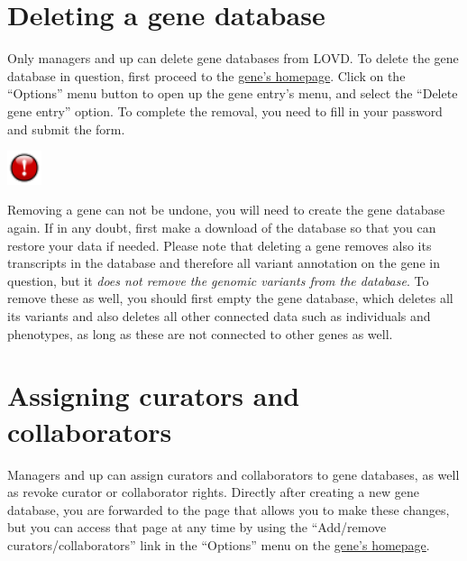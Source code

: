 \documentclass[a4paper,oneside,openany,12pt]{memoir}
\newlength{\infoboxlength}
\newlength{\infoboxinnerlength}
\newenvironment{warntable}
  {\begin{lrbox}{\infobox}%
    \begin{minipage}[t]{1.5cm}
      \centering
      \vspace{0pt}
      \includegraphics[width=1cm,height=1cm]{lovd_warning.png}
    \end{minipage}
   \begin{minipage}[t]{\infoboxlength}\vspace{5pt}\begin{minipage}{\infoboxinnerlength}}
  {\vspace{6pt}\end{minipage}\end{minipage}\end{lrbox}%
   \begin{center}
   \fcolorbox{black}{LOVDlight}{\usebox{\infobox}}
   \end{center}}
\renewenvironment{leftbar}[1][\hsize]
{%
    \def\FrameCommand
    {%
        {\color{LOVDdark}\vrule width 3pt \hspace{5pt}}%
        \colorbox{LOVDlight}%
    }%
    \MakeFramed{\hsize#1\advance\hsize-\width\FrameRestore}%
}
{\endMakeFramed}
\begin{document}
\hypertarget{sec:gene_delete}{}
\section{Deleting a gene database}
Only managers and up can delete gene databases from LOVD.
To delete the gene database in question, first proceed to the \hyperlink{sec:gene_homepage}{gene's homepage}.
Click on the ``Options'' menu button to open up the gene entry's menu, and select the ``Delete gene entry'' option.
To complete the removal, you need to fill in your password and submit the form.

\begin{warntable}
Removing a gene can not be undone, you will need to create the gene database again.
If in any doubt, first make a download of the database so that you can restore your data if needed.
Please note that deleting a gene removes also its transcripts in the database and therefore
 all variant annotation on the gene in question, but it \emph{does not remove the genomic variants from the database}.
To remove these as well, you should first empty the gene database, which deletes all its variants and also deletes
 all other connected data such as individuals and phenotypes, as long as these are not connected to other genes as well.
\end{warntable}





\hypertarget{sec:gene_assign_curators}{}
\section{Assigning curators and collaborators}
Managers and up can assign curators and collaborators to gene databases, as well as revoke curator or collaborator rights.
Directly after creating a new gene database, you are forwarded to the page that allows you to make these changes,
 but you can access that page at any time by using the ``Add/remove curators/collaborators'' link in the
 ``Options'' menu on the \hyperlink{sec:gene_homepage}{gene's homepage}.
\end{document}
